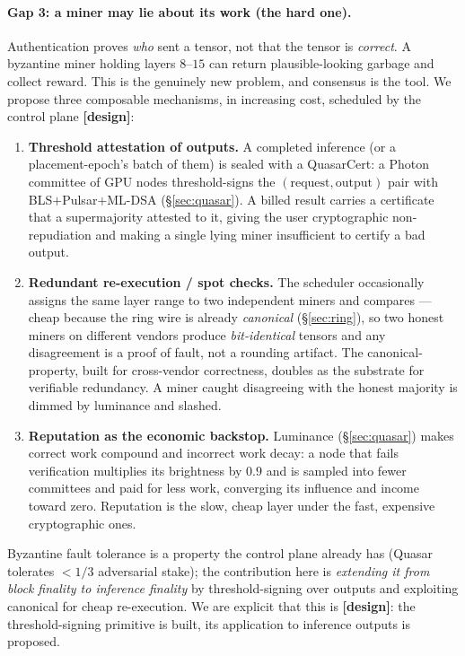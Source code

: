 \documentclass[11pt]{article}
\newcommand{\design}{\textcolor{cmt}{\small\textbf{[design]}}}
\begin{document}
\paragraph{Gap 3: a miner may lie about its work (the hard one).} Authentication proves
\emph{who} sent a tensor, not that the tensor is \emph{correct}. A byzantine miner holding layers
$8$--$15$ can return plausible-looking garbage and collect reward. This is the genuinely new
problem, and consensus is the tool. We propose three composable mechanisms, in increasing cost,
scheduled by the control plane \design{}:
\begin{enumerate}[leftmargin=1.5em,itemsep=2pt]
\item \textbf{Threshold attestation of outputs.} A completed inference (or a placement-epoch's
batch of them) is sealed with a QuasarCert: a Photon committee of GPU nodes threshold-signs the
$(\text{request}, \text{output})$ pair with BLS$+$Pulsar$+$ML-DSA (\S\ref{sec:quasar}). A billed
result carries a certificate that a supermajority attested to it, giving the user cryptographic
non-repudiation and making a single lying miner insufficient to certify a bad output.
\item \textbf{Redundant re-execution / spot checks.} The scheduler occasionally assigns the same
layer range to two independent miners and compares --- cheap because the ring wire is already
\emph{canonical}  (\S\ref{sec:ring}), so two honest miners on different vendors produce
\emph{bit-identical} tensors and any disagreement is a proof of fault, not a rounding artifact.
The canonical- property, built for cross-vendor correctness, doubles as the substrate
for verifiable redundancy. A miner caught disagreeing with the honest majority is dimmed by
luminance and slashed.
\item \textbf{Reputation as the economic backstop.} Luminance (\S\ref{sec:quasar}) makes
correct work compound and incorrect work decay: a node that fails verification multiplies its
brightness by $0.9$ and is sampled into fewer committees and paid for less work, converging its
influence and income toward zero. Reputation is the slow, cheap layer under the fast, expensive
cryptographic ones.
\end{enumerate}
Byzantine fault tolerance is a property the control plane already has (Quasar tolerates $<1/3$
adversarial stake); the contribution here is \emph{extending it from block finality to inference
finality} by threshold-signing over outputs and exploiting canonical  for cheap
re-execution. We are explicit that this is \design{}: the threshold-signing primitive is built,
its application to inference outputs is proposed.
\end{document}
